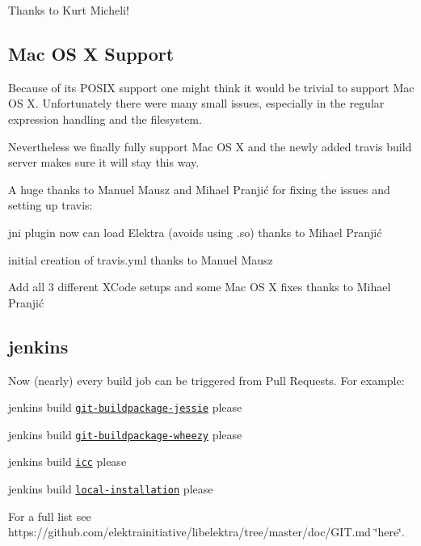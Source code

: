 Thanks to Kurt Micheli!

\subsection*{Mac O\+S X Support}

Because of its P\+O\+S\+I\+X support one might think it would be trivial to support Mac O\+S X. Unfortunately there were many small issues, especially in the regular expression handling and the filesystem.

Nevertheless we finally fully support Mac O\+S X and the newly added travis build server makes sure it will stay this way.

A huge thanks to Manuel Mausz and Mihael Pranjić for fixing the issues and setting up travis\+:


\begin{DoxyItemize}
\item jni plugin now can load Elektra (avoids using {\ttfamily .so}) thanks to Mihael Pranjić
\item initial creation of travis.\+yml thanks to Manuel Mausz
\item Add all 3 different X\+Code setups and some Mac O\+S X fixes thanks to Mihael Pranjić
\end{DoxyItemize}

\subsection*{jenkins}

Now (nearly) every build job can be triggered from Pull Requests. For example\+:


\begin{DoxyItemize}
\item jenkins build \href{http://build.libelektra.org:8080/job/elektra-git-buildpackage-jessie/}{\tt git-\/buildpackage-\/jessie} please
\item jenkins build \href{http://build.libelektra.org:8080/job/elektra-git-buildpackage-wheezy/}{\tt git-\/buildpackage-\/wheezy} please
\item jenkins build \href{http://build.libelektra.org:8080/job/elektra-icc/}{\tt icc} please
\item jenkins build \href{http://build.libelektra.org:8080/job/elektra-local-installation/}{\tt local-\/installation} please
\end{DoxyItemize}

For a full list see https\+://github.com/elektrainitiative/libelektra/tree/master/doc/\+G\+I\+T.\+md \char`\"{}here\char`\"{}.

